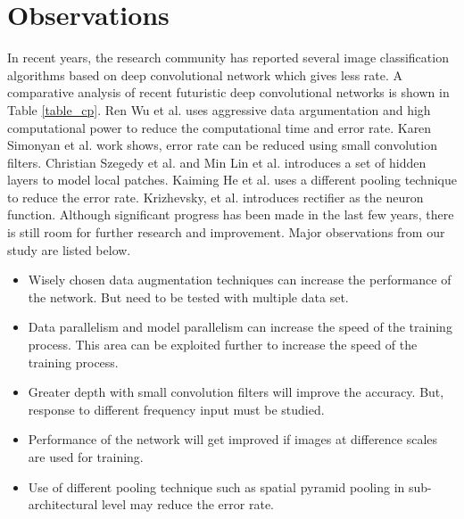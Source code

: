 \documentclass{llncs}
\begin{document}
 \section {Observations}
In recent years, the research community has reported several image classification algorithms based on deep convolutional network which gives less rate. A comparative analysis of recent futuristic deep convolutional networks is shown in Table \ref{table_cp}.
  Ren Wu et al. \cite{Wu2015} uses aggressive data argumentation and high computational power to reduce the computational time and error rate. Karen Simonyan et al. \cite{Arge2015} work shows, error rate can be reduced using small convolution filters. Christian Szegedy  et al. \cite{Szegedy} and Min Lin et al. \cite{Lin2013} introduces a set of hidden layers to model local patches. Kaiming He et al. \cite{He2014} uses a different pooling technique to reduce the error rate. Krizhevsky, et al. \cite{Krizhevsky2012a}  introduces  rectifier  as the neuron function. Although significant progress has been made in the last few years, there is still room for further research and improvement. Major observations from our study are listed below.
 \begin{itemize}
 \itemsep0em 
 \item  Wisely chosen data  augmentation techniques can increase the performance of the network. But need to be tested with multiple data set.
 \item Data parallelism and model parallelism can increase the speed of the training process. This area can be exploited further to increase the speed of the training process.
 \item Greater depth with small convolution filters will improve the accuracy. But, response to different frequency input must be studied.
 \item Performance of the network will get improved if images at difference scales are used for training.
 \item Use of different pooling technique such as spatial pyramid pooling in sub-architectural level may reduce the error rate. 
 \end{itemize}
 
 
\end{document}
